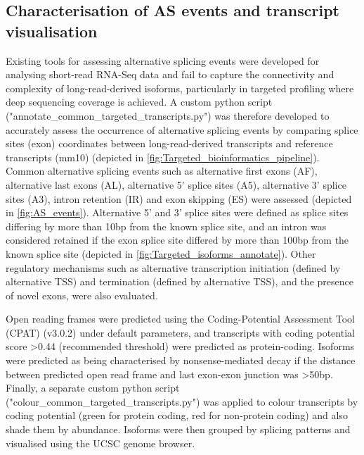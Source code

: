 \newpage
\subsection{Characterisation of AS events and transcript visualisation}
\label{ch6: methods_characterisation}
Existing tools for assessing alternative splicing events were developed for analysing short-read RNA-Seq data and fail to capture the connectivity and complexity of long-read-derived isoforms, particularly in targeted profiling where deep sequencing coverage is achieved. A custom python script ("annotate\_common\_targeted\_transcripts.py") was therefore developed to accurately assess the occurrence of alternative splicing events by comparing splice sites (exon) coordinates between long-read-derived transcripts and reference transcripts (mm10) (depicted in \cref{fig:Targeted_bioinformatics_pipeline}). Common alternative splicing events such as alternative first exons (AF), alternative last exons (AL), alternative 5' splice sites (A5), alternative 3' splice sites (A3), intron retention (IR) and exon skipping (ES) were assessed (depicted in \cref{fig:AS_events}). Alternative 5' and 3' splice sites were defined as splice sites differing by more than 10bp from the known splice site, and an intron was considered retained if the exon splice site differed by more than 100bp from the known splice site (depicted in \cref{fig:Targeted_isoforms_annotate}). Other regulatory mechanisms such as alternative transcription initiation (defined by alternative TSS) and termination (defined by alternative TSS), and the presence of novel exons, were also evaluated. 

Open reading frames were predicted using the Coding-Potential Assessment Tool\cite{Wang2013b} (CPAT) (v3.0.2) under default parameters, and transcripts with coding potential score >0.44 (recommended threshold) were predicted as protein-coding. Isoforms were predicted as being characterised by nonsense-mediated decay if the distance between predicted open read frame and last exon-exon junction was >50bp. Finally, a separate custom python script ("colour\_common\_targeted\_transcripts.py") was applied to colour transcripts by coding potential (green for protein coding, red for non-protein coding) and also shade them by abundance. Isoforms were then grouped by splicing patterns and visualised using the UCSC genome browser. 

